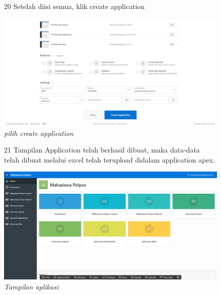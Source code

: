 \begin{enumerate}
\begin{figure}[!htbp]
\item[20] Setelah diisi semua, klik create application
	\begin{center}
	\includegraphics[scale=0.2]{figures/tahap22.png}
	\caption{\textit{pilih create application}}
	\end{center}	 
\end{figure}

\begin{figure}[!htbp]
\item[21]Tampilan Application telah berhasil dibuat, maka data-data telah dibuat melalui excel telah terupload didalam application apex.
	\begin{center}
	\includegraphics[scale=0.2]{figures/tahap23.png}
	\caption{\textit{Tampilan aplikasi}}
	\end{center}	 
\end{figure}


\end{enumerate}
